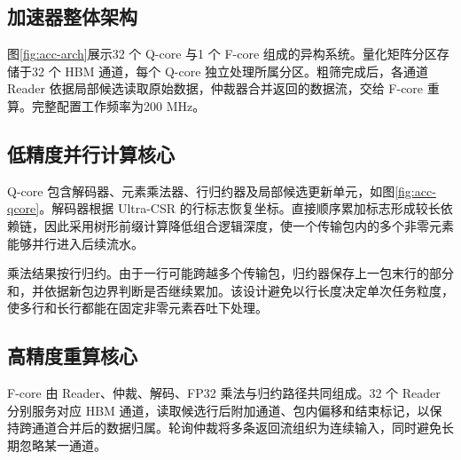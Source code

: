 \subsection{加速器整体架构}
图\ref{fig:acc-arch}展示32 个 Q-core 与1 个 F-core 组成的异构系统。量化矩阵分区存储于32 个 HBM 通道，每个 Q-core 独立处理所属分区。粗筛完成后，各通道 Reader 依据局部候选读取原始数据，仲裁器合并返回的数据流，交给 F-core 重算。完整配置工作频率为200 MHz。


\subsection{低精度并行计算核心}
Q-core 包含解码器、元素乘法器、行归约器及局部候选更新单元，如图\ref{fig:acc-qcore}。解码器根据 Ultra-CSR 的行标志恢复坐标。直接顺序累加标志形成较长依赖链，因此采用树形前缀计算降低组合逻辑深度，使一个传输包内的多个非零元素能够并行进入后续流水。


乘法结果按行归约。由于一行可能跨越多个传输包，归约器保存上一包末行的部分和，并依据新包边界判断是否继续累加。该设计避免以行长度决定单次任务粒度，使多行和长行都能在固定非零元素吞吐下处理。

\subsection{高精度重算核心}
F-core 由 Reader、仲裁、解码、FP32 乘法与归约路径共同组成。32 个 Reader 分别服务对应 HBM 通道，读取候选行后附加通道、包内偏移和结束标记，以保持跨通道合并后的数据归属。轮询仲裁将多条返回流组织为连续输入，同时避免长期忽略某一通道。


